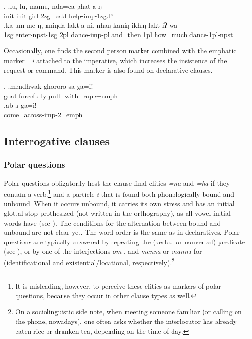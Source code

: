 \ex. \ag.lu,         lu,         mamu, nda=ca        phat-a-ŋ\\
{\sc init} {\sc init} girl {\sc 2sg=add} help{\sc -imp-1sg.P} \\
 
\bg.ka  um-me-ŋ,            nniŋda lakt-a-ni,           nhaŋ    kaniŋ ikhiŋ   lakt-iʔ-wa\\
{\sc 1sg} enter{\sc -npst-1sg}  {\sc 2pl} dance{\sc -imp-pl} and\_then {\sc 1pl} how\_much dance{\sc -1pl-npst}\\
 

Occasionally, one finds the second person marker combined with the emphatic marker \emph{=i} attached to the imperative, which increases the insistence  of the request or command. This marker is also found on declarative clauses.

\ex. \ag.mendhwak ghororo sa-ga=i!\\
goat forcefully pull\_with\_rope{=emph}\\
\bg.ab-a-ga=i!\\
come\_across{\sc -imp-2=emph}\\

\subsection{Interrogative clauses}
  
  
  
\subsubsection{Polar questions}
 
 Polar questions obligatorily host the clause-final clitics \emph{=na} and \emph{=ha} if they contain a verb,\footnote{It is misleading, however, to perceive these clitics as markers of polar questions, because they occur in other clause types as well.} and  a particle \emph{i}  that is found both phonologically bound and unbound. When it occurs unbound, it carries its own stress and has an initial glottal stop prothesized (not written in the orthography), as all  vowel-initial words have (see \Next). The conditions for the alternation between bound and unbound are not clear yet. The word order is the same as in declaratives. Polar questions are typically answered by repeating the (verbal or nonverbal)  predicate (see \NNext), or by one of the interjections \emph{om} , and \emph{menna} or \emph{manna} for  (identificational and existential/locational, respectively).\footnote{On a sociolinguistic side note, when meeting someone familiar (or calling on the phone, nowadays), one often asks whether the interlocutor has already eaten rice or drunken tea, depending on the time of day.}
 
